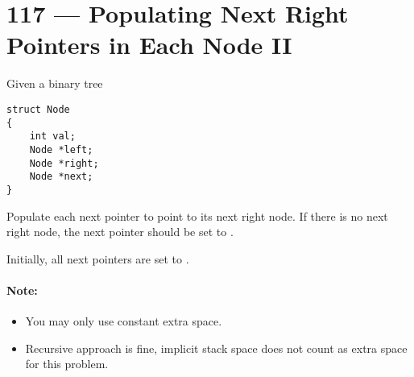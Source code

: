 \section{117 --- Populating Next Right Pointers in Each Node II}
Given a binary tree

\setcounter{lstlisting}{0}
\begin{lstlisting}[style=customc]
struct Node
{
    int val;
    Node *left;
    Node *right;
    Node *next;
}
\end{lstlisting}

Populate each next pointer to point to its next right node. If there is no next right node, the next pointer should be set to .

Initially, all next pointers are set to .
\paragraph{Note:}
\begin{itemize}
\item You may only use constant extra space.
\item Recursive approach is fine, implicit stack space does not count as extra space for this problem.
\end{itemize}
